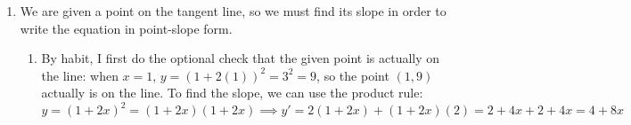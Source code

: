 \documentclass{article}
\begin{document}
\begin{enumerate}
\item %
  We are given a point on the tangent line, so we must find its slope in order
  to write the equation in point-slope form.
  \begin{enumerate}
  \item By habit, I first do the optional check that the given point is
    actually on the line: when $x=1$, $y=(1+2(1))^2=3^2=9$, so the point
    $(1,9)$ actually is on the line.  To find the slope, we 
    can use the product rule:
    \begin{equation*}
      y = (1+2x)^2 = (1+2x)(1+2x) \implies
      y' = 2(1+2x)+(1+2x)(2) = 2 + 4x + 2 + 4x = 4 + 8x

\end{equation*}
\end{enumerate}
\end{enumerate}
\end{document}
